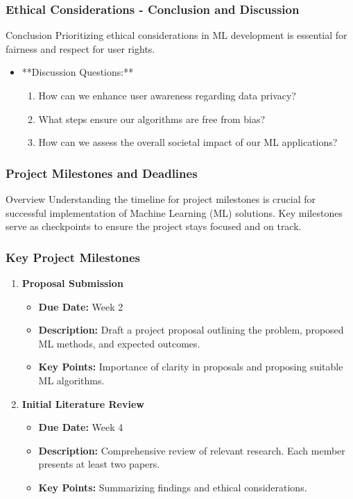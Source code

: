 \documentclass[aspectratio=169]{beamer}
\begin{document}
\begin{frame}[fragile]
    \frametitle{Ethical Considerations - Conclusion and Discussion}
    \begin{block}{Conclusion}
        Prioritizing ethical considerations in ML development is essential for fairness and respect for user rights.
    \end{block}
    \begin{itemize}
        \item **Discussion Questions:**
        \begin{enumerate}
            \item How can we enhance user awareness regarding data privacy?
            \item What steps ensure our algorithms are free from bias?
            \item How can we assess the overall societal impact of our ML applications?
        \end{enumerate}
    \end{itemize}
\end{frame}

\begin{frame}[fragile]
    \frametitle{Project Milestones and Deadlines}
    \begin{block}{Overview}
        Understanding the timeline for project milestones is crucial for successful implementation of Machine Learning (ML) solutions. 
        Key milestones serve as checkpoints to ensure the project stays focused and on track.
    \end{block}
\end{frame}

\begin{frame}[fragile]
    \frametitle{Key Project Milestones}
    \begin{enumerate}
        \item \textbf{Proposal Submission} 
            \begin{itemize}
                \item \textbf{Due Date:} Week 2
                \item \textbf{Description:} Draft a project proposal outlining the problem, proposed ML methods, and expected outcomes.
                \item \textbf{Key Points:} Importance of clarity in proposals and proposing suitable ML algorithms.
            \end{itemize}
        
        \item \textbf{Initial Literature Review} 
            \begin{itemize}
                \item \textbf{Due Date:} Week 4
                \item \textbf{Description:} Comprehensive review of relevant research. Each member presents at least two papers.
                \item \textbf{Key Points:} Summarizing findings and ethical considerations.
            \end{itemize}
    \end{enumerate}
\end{frame}
\end{document}
